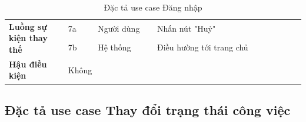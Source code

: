 \documentclass[../DoAn.tex]{subfiles}
\begin{document}
\begin{table}[ht]
\begin{tabular}{| p{0.2\linewidth} | p{0.1\linewidth} | p{0.2\linewidth} | p{0.5\linewidth} |}
        \multirow{2}{\linewidth}{\textbf{Luồng sự kiện thay thế}}    & \multicolumn{1}{p{0.1\linewidth}|}{7a}                                                            & \multicolumn{1}{p{0.2\linewidth}|}{Người dùng}             & \multicolumn{1}{p{0.5\linewidth}|}{Nhấn nút "Huỷ"}                                                                         \\ \cline{2-4}
                                                                     & \multicolumn{1}{p{0.1\linewidth}|}{7b}                                                            & \multicolumn{1}{p{0.2\linewidth}|}{Hệ thống}               & \multicolumn{1}{p{0.5\linewidth}|}{Điều hường tới trang chủ}                                                               \\ \hline
        \textbf{Hậu điều kiện}                                       & \multicolumn{3}{p{0.1\linewidth}|}{Không}                                                                                                                                                                                                                                                   \\ \hline
    \end{tabular}%
    \renewcommand{\arraystretch}{1}
    \caption{Đặc tả use case Đăng nhập}
    \label{tab:UC02}
\end{table}

\newpage

\subsection{Đặc tả use case Thay đổi trạng thái công việc}
\label{subsection:2.3.3}
\end{document}
